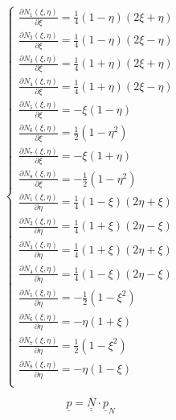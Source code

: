 \documentclass[a4paper]{jpconf}
\begin{document}
\begin{equation}
\begin{cases}
\frac{\partial N_{1}\left(\xi,\eta\right)}{\partial \xi}=\frac{1}{4}\left(1-\eta\right)\left(2\xi+\eta\right)\\
\frac{\partial N_{2}\left(\xi,\eta\right)}{\partial \xi}=\frac{1}{4}\left(1-\eta\right)\left(2\xi-\eta\right)\\
\frac{\partial N_{3}\left(\xi,\eta\right)}{\partial \xi}=\frac{1}{4}\left(1+\eta\right)\left(2\xi+\eta\right)\\
\frac{\partial N_{4}\left(\xi,\eta\right)}{\partial \xi}=\frac{1}{4}\left(1+\eta\right)\left(2\xi-\eta\right)\\
\frac{\partial N_{5}\left(\xi,\eta\right)}{\partial \xi}=-\xi\left(1-\eta\right)\\
\frac{\partial N_{6}\left(\xi,\eta\right)}{\partial \xi}=\frac{1}{2}\left(1-\eta^{2}\right)\\
\frac{\partial N_{7}\left(\xi,\eta\right)}{\partial \xi}=-\xi\left(1+\eta\right)\\
\frac{\partial N_{8}\left(\xi,\eta\right)}{\partial \xi}=-\frac{1}{2}\left(1-\eta^{2}\right)\\
\frac{\partial N_{1}\left(\xi,\eta\right)}{\partial \eta}=\frac{1}{4}\left(1-\xi\right)\left(2\eta+\xi\right)\\
\frac{\partial N_{2}\left(\xi,\eta\right)}{\partial \eta}=\frac{1}{4}\left(1+\xi\right)\left(2\eta-\xi\right)\\
\frac{\partial N_{3}\left(\xi,\eta\right)}{\partial \eta}=\frac{1}{4}\left(1+\xi\right)\left(2\eta+\xi\right)\\
\frac{\partial N_{4}\left(\xi,\eta\right)}{\partial \eta}=\frac{1}{4}\left(1-\xi\right)\left(2\eta-\xi\right)\\
\frac{\partial N_{5}\left(\xi,\eta\right)}{\partial \eta}=-\frac{1}{2}\left(1-\xi^{2}\right)\\
\frac{\partial N_{6}\left(\xi,\eta\right)}{\partial \eta}=-\eta\left(1+\xi\right)\\
\frac{\partial N_{7}\left(\xi,\eta\right)}{\partial \eta}=\frac{1}{2}\left(1-\xi^{2}\right)\\
\frac{\partial N_{8}\left(\xi,\eta\right)}{\partial \eta}=-\eta\left(1-\xi\right)\\
\end{cases}
\end{equation}

\begin{equation}
\underline{p}=\underline{\underline{N}}\cdot\underline{p}_{N}
\end{equation}
\end{document}
